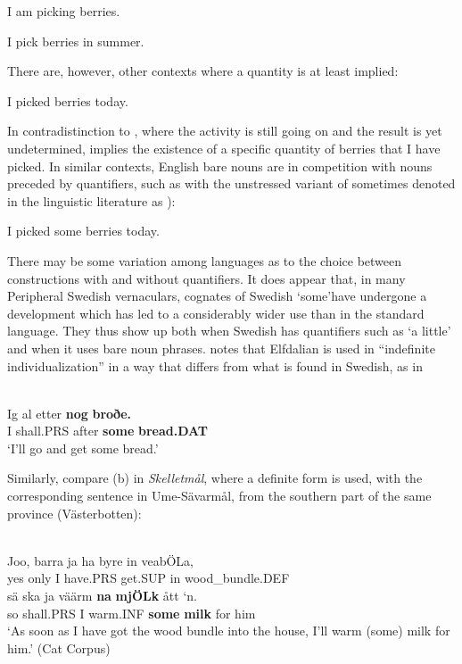 \ea
\gl \label{bkm:Ref78699401}I am picking berries.  
 \z

 \ea 
 \gl \label{bkm:Ref95014405}I pick berries in summer.
 \z 

There are, however, other contexts where a quantity is at least implied:

\ea
\gl \label{bkm:Ref78699451}I picked berries today. 
\z 

In contradistinction to , where the activity is still going on and the result is yet undetermined,  implies the existence of a specific quantity of berries that I have picked. In similar contexts, English bare nouns are in competition with nouns preceded by quantifiers, such as with the unstressed variant of  sometimes denoted in the linguistic literature as ):

\ea
\gl I picked some berries today.  
\z


There may be some variation among languages as to the choice between constructions with and without quantifiers. It does appear that, in many Peripheral Swedish vernaculars, cognates of Swedish  ‘some’\textstyleLinguisticExample{ }have undergone a development which has led to a considerably wider use than in the standard language. They thus show up both when Swedish has quantifiers such as  ‘a little’ and when it uses bare noun phrases. \citet[110]{Levander1909} notes that Elfdalian is used in “indefinite individualization” in a way that differs from what is found in Swedish, as in 

\ea \label{} 
\\
\gll Ig  al  etter  \textbf{nog} \textbf{  broðe.}\\
I  shall.PRS  after  \textbf{some} \textbf{bread.DAT}\\
\glt ‘I’ll go and get some bread.’ 

\z

Similarly, compare (b) in \textit{Skelletmål}, where a definite form  is used, with the corresponding sentence in Ume-Sävarmål, from the southern part of the same province (Västerbotten):

\ea \label{} 
\\
\gll Joo,  barra  ja  ha  byre  in  veabÖLa,  \\
yes  only  I  have.PRS  get.SUP  in  wood\_bundle.DEF  \\
\gll sä  ska  ja  väärm  \textbf{na} \textbf{mjÖLk} ått  ‘n.\\
so  shall.PRS  I  warm.INF  \textbf{some} \textbf{milk} for   him\\
\glt ‘As soon as I have got the wood bundle into the house, I’ll warm (some) milk for him.’ (Cat Corpus)


